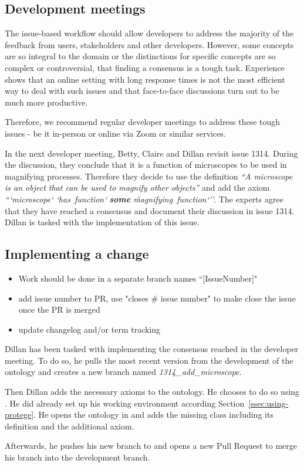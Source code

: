 \subsection{Development meetings}

The issue-based workflow should allow developers to address the majority of the feedback from users, stakeholders and other developers. However, some concepts are so integral to the domain or the distinctions for specific concepts are so complex or controversial, that finding a consensus is a tough task. Experience shows that an online setting with long response times is not the most efficient way to deal with such issues and that face-to-face discussions turn out to be much more productive.

Therefore, we recommend regular developer meetings to address these tough issues - be it in-person or online via Zoom or similar services. 

\begin{example}
In the next developer meeting, Betty, Claire and Dillan revisit issue 1314. During the discussion, they conclude that it is a function of microscopes to be used in magnifying processes. Therefore they decide to use the definition \emph{``A microscope is an object that can be used to magnify other objects''} and add the axiom
\emph{```microscope` `has~function` \textbf{some} \`magnifying~function`''}.
The experts agree that they have reached a consensus and document their discussion in issue 1314. Dillan is tasked with the implementation of this issue.
\end{example}

\subsection{Implementing a change}
\begin{itemize}
    \item  Work should be done in a separate branch names ``[IssueNumber]"
    \item add issue number to PR, use "closes \# issue number" to make {\github} close the issue once the PR is merged
    \item update changelog and/or term tracking
\end{itemize}

\begin{example}
Dillan has been tasked with implementing the consensus reached in the developer meeting. To do so, he pulls the most recent version from the development of the ontology and creates a new branch named \textit{1314\_add\_microscope}.

Then Dillan adds the necessary axioms to the ontology. He chooses to do so using {\protege}. He did already set up his working environment according Section~\ref{ssec:using-protege}. He opens the ontology in {\protege} and adds the missing class including its definition and the additional axiom.

Afterwards, he pushes his new branch to {\github} and opens a new Pull Request to merge his branch into the development branch.
\end{example}

